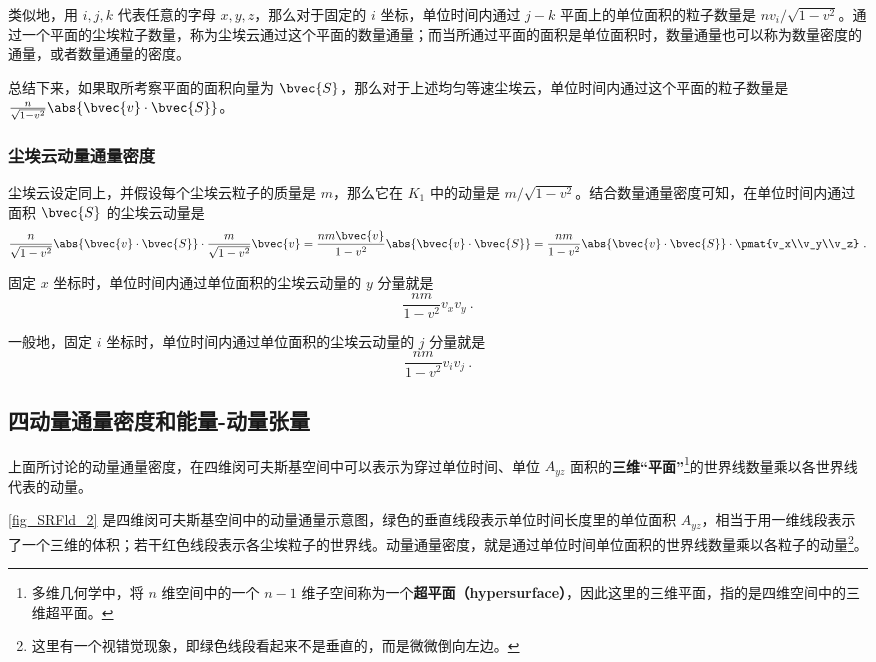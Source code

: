 类似地，用 $i, j, k$ 代表任意的字母 $x, y, z$，那么对于固定的 $i$ 坐标，单位时间内通过 $j-k$ 平面上的单位面积的粒子数量是 $nv_i/\sqrt{1-v^2}$。通过一个平面的尘埃粒子数量，称为尘埃云通过这个平面的数量通量；而当所通过平面的面积是单位面积时，数量通量也可以称为数量密度的通量，或者数量通量的密度。

总结下来，如果取所考察平面的面积向量为 $\bvec{S}$，那么对于上述均匀等速尘埃云，单位时间内通过这个平面的粒子数量是 $\frac{n}{\sqrt{1-v^2}}\abs{\bvec{v}\cdot\bvec{S}}$。

\subsubsection{尘埃云动量通量密度}

尘埃云设定同上，并假设每个尘埃云粒子的质量是 $m$，那么它在 $K_1$ 中的动量是 $m/\sqrt{1-v^2}$。结合数量通量密度可知，在单位时间内通过面积 $\bvec{S}$ 的尘埃云动量是
\begin{equation}
\frac{n}{\sqrt{1-v^2}}\abs{\bvec{v}\cdot\bvec{S}}\cdot\frac{m}{\sqrt{1-v^2}}\bvec{v}=\frac{nm\bvec{v}}{1-v^2}\abs{\bvec{v}\cdot\bvec{S}}=\frac{nm}{1-v^2}\abs{\bvec{v}\cdot\bvec{S}}\cdot\pmat{v_x\\v_y\\v_z}~.
\end{equation}

固定 $x$ 坐标时，单位时间内通过单位面积的尘埃云动量的 $y$ 分量就是
\begin{equation}
\frac{nm}{1-v^2}v_xv_y~.
\end{equation}

一般地，固定 $i$ 坐标时，单位时间内通过单位面积的尘埃云动量的 $j$ 分量就是
\begin{equation}\label{eq_SRFld_1}
\frac{nm}{1-v^2}v_iv_j~.
\end{equation}

\subsection{四动量通量密度和能量-动量张量}

上面所讨论的动量通量密度，在四维闵可夫斯基空间中可以表示为穿过单位时间、单位 $A_{yz}$ 面积的\textbf{三维“平面”}\footnote{多维几何学中，将 $n$ 维空间中的一个 $n-1$ 维子空间称为一个\textbf{超平面（hypersurface）}，因此这里的三维平面，指的是四维空间中的三维超平面。}的世界线数量乘以各世界线代表的动量。

\autoref{fig_SRFld_2} 是四维闵可夫斯基空间中的动量通量示意图，绿色的垂直线段表示单位时间长度里的单位面积 $A_{yz}$，相当于用一维线段表示了一个三维的体积；若干红色线段表示各尘埃粒子的世界线。动量通量密度，就是通过单位时间单位面积的世界线数量乘以各粒子的动量\footnote{这里有一个视错觉现象，即绿色线段看起来不是垂直的，而是微微倒向左边。}。


